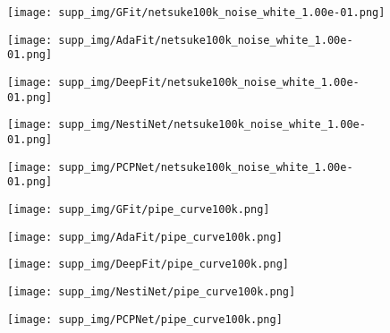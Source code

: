 \documentclass[runningheads]{llncs}
\begin{document}
\begin{figure*}
\begin{subfigure}{0.15\linewidth}
		\centering
		\texttt{[image: supp\_img/GFit/netsuke100k\_noise\_white\_1.00e-01.png]}
\end{subfigure}
	\hspace{0.1cm}
	\begin{subfigure}{0.15\linewidth}
		\centering
		\texttt{[image: supp\_img/AdaFit/netsuke100k\_noise\_white\_1.00e-01.png]}
\end{subfigure}
	\hspace{0.1cm}
	\begin{subfigure}{0.17\linewidth}
		\centering
		\texttt{[image: supp\_img/DeepFit/netsuke100k\_noise\_white\_1.00e-01.png]}
\end{subfigure}
	\hspace{0.1cm}
	\begin{subfigure}{0.17\linewidth}
		\centering
		\texttt{[image: supp\_img/NestiNet/netsuke100k\_noise\_white\_1.00e-01.png]}
\end{subfigure}
	\hspace{0.1cm}
	\begin{subfigure}{0.17\linewidth}
		\centering
		\texttt{[image: supp\_img/PCPNet/netsuke100k\_noise\_white\_1.00e-01.png]}
\end{subfigure}
	
\begin{subfigure}{0.15\linewidth}
		\centering
		\texttt{[image: supp\_img/GFit/pipe\_curve100k.png]}
\end{subfigure}
	\hspace{0.1cm}
	\begin{subfigure}{0.15\linewidth}
		\centering
		\texttt{[image: supp\_img/AdaFit/pipe\_curve100k.png]}
\end{subfigure}
	\hspace{0.1cm}
	\begin{subfigure}{0.17\linewidth}
		\centering
		\texttt{[image: supp\_img/DeepFit/pipe\_curve100k.png]}
\end{subfigure}
	\hspace{0.1cm}
	\begin{subfigure}{0.17\linewidth}
		\centering
		\texttt{[image: supp\_img/NestiNet/pipe\_curve100k.png]}
\end{subfigure}
	\hspace{0.1cm}
	\begin{subfigure}{0.17\linewidth}
		\centering
		\texttt{[image: supp\_img/PCPNet/pipe\_curve100k.png]}
\end{subfigure}
	

\end{figure*}
\end{document}
